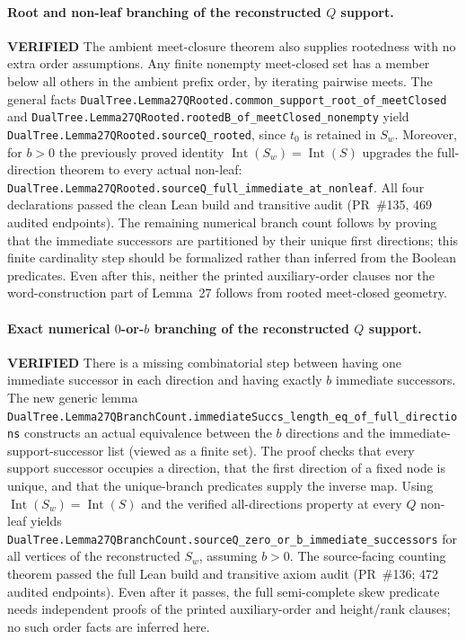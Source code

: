 \documentclass[11pt]{article}
\newcommand{\ok}{\textcolor{green!40!black}{\textbf{VERIFIED}}}
\newcommand{\lean}[1]{\texttt{#1}}
\begin{document}
\paragraph{Root and non-leaf branching of the reconstructed $Q$ support.} \ok
The ambient meet-closure theorem also supplies rootedness with no
extra order assumptions. Any finite nonempty meet-closed set has a
member below all others in the ambient prefix order, by iterating
pairwise meets. The general facts
\lean{DualTree.Lemma27QRooted.common_support_root_of_meetClosed}
and \lean{DualTree.Lemma27QRooted.rootedB_of_meetClosed_nonempty}
yield \lean{DualTree.Lemma27QRooted.sourceQ_rooted}, since $t_0$
is retained in $S_w$. Moreover, for $b>0$ the previously proved
identity $\operatorname{Int}(S_w)=\operatorname{Int}(S)$
upgrades the full-direction theorem to every actual non-leaf:
\lean{DualTree.Lemma27QRooted.sourceQ_full_immediate_at_nonleaf}.
All four declarations passed the clean Lean build and transitive
audit (PR~\#135, 469 audited endpoints).
The remaining numerical branch count follows by proving that the
immediate successors are partitioned by their unique first
directions; this finite cardinality step should be formalized rather
than inferred from the Boolean predicates. Even after this, neither
the printed auxiliary-order clauses nor the word-construction
part of Lemma~27 follows from rooted meet-closed geometry.

\paragraph{Exact numerical $0$-or-$b$ branching of the reconstructed $Q$ support.} \ok
There is a missing combinatorial step between
having one immediate successor in each direction and having exactly
$b$ immediate successors. The new generic lemma
\lean{DualTree.Lemma27QBranchCount.immediateSuccs_length_eq_of_full_directions}
constructs an actual equivalence between the $b$ directions and
the immediate-support-successor list (viewed as a finite set).
The proof checks that every support successor occupies a direction,
that the first direction of a fixed node is unique, and that
the unique-branch predicates supply the inverse map.
Using $\operatorname{Int}(S_w)=\operatorname{Int}(S)$ and the
verified all-directions property at every $Q$ non-leaf yields
\lean{DualTree.Lemma27QBranchCount.sourceQ_zero_or_b_immediate_successors}
for all vertices of the reconstructed $S_w$, assuming $b>0$.
The source-facing counting theorem passed the full Lean build and transitive
axiom audit (PR~\#136; 472 audited endpoints).
Even after it passes, the full semi-complete skew predicate
needs independent proofs of the printed auxiliary-order and
height/rank clauses; no such order facts are inferred here.
\end{document}
